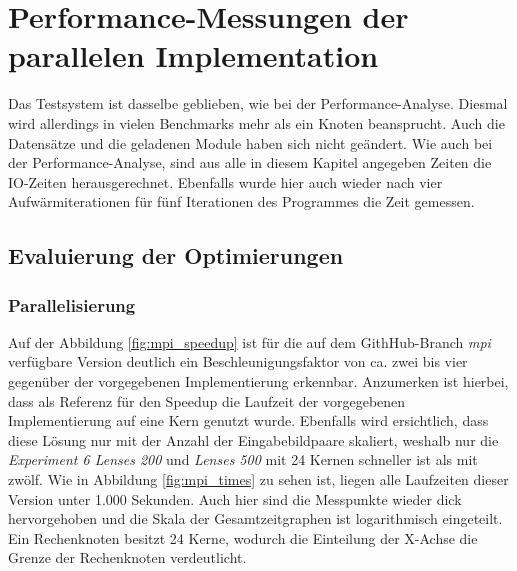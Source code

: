 \chapter{Performance-Messungen der parallelen Implementation}

Das Testsystem ist dasselbe geblieben, wie bei der Performance-Analyse. Diesmal wird allerdings in vielen Benchmarks mehr als ein Knoten beansprucht. Auch die Datensätze und die geladenen Module haben sich nicht geändert. Wie auch bei der Performance-Analyse, sind aus alle in diesem Kapitel angegeben Zeiten die \gls{IO}-Zeiten herausgerechnet. Ebenfalls wurde hier auch wieder nach vier Aufwärmiterationen für fünf Iterationen des Programmes die Zeit gemessen. 

\section{Evaluierung der Optimierungen}

\subsection{Parallelisierung}

Auf der Abbildung \ref{fig:mpi_speedup} ist für die auf dem GithHub-Branch \textit{mpi} verfügbare Version \cite{Coj17} deutlich ein Beschleunigungsfaktor von ca. zwei bis vier gegenüber der vorgegebenen Implementierung erkennbar. Anzumerken ist hierbei, dass als Referenz für den Speedup die Laufzeit der vorgegebenen Implementierung auf eine Kern genutzt wurde. Ebenfalls wird ersichtlich, dass diese Lösung nur mit der Anzahl der Eingabebildpaare skaliert, weshalb nur die \textit{Experiment 6 Lenses 200} und \textit{Lenses 500} mit 24 Kernen schneller ist als mit zwölf. Wie in Abbildung \ref{fig:mpi_times} zu sehen ist, liegen alle Laufzeiten dieser Version unter 1.000 Sekunden. Auch hier sind die Messpunkte wieder dick hervorgehoben und die Skala der Gesamtzeitgraphen ist logarithmisch eingeteilt. Ein Rechenknoten besitzt 24 Kerne, wodurch die Einteilung der X-Achse die Grenze der Rechenknoten verdeutlicht. 

